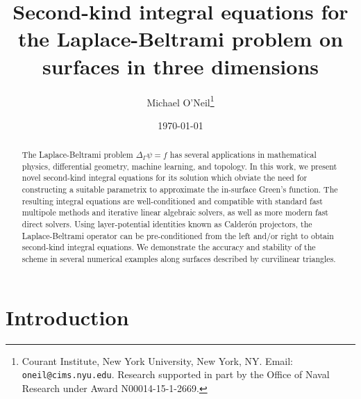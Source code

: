 \documentclass[11pt]{article}
\title{\bf\sffamily Second-kind integral equations for the Laplace-Beltrami
  problem on  surfaces in three dimensions}
\author{Michael O'Neil\footnote{Courant Institute,  New York University, New
    York, NY. Email: {\tt oneil@cims.nyu.edu}. Research supported in
  part by the Office of Naval Research under Award N00014-15-1-2669.}}
\date{\today}
\newcommand{\surflap}{\Delta_\Gamma}
\numberwithin{equation}{section}
\begin{document}
\maketitle 
\begin{abstract}
  The Laplace-Beltrami problem $\surflap \psi = f$ has several
  applications in mathematical physics, differential geometry, machine
  learning, and topology. In this work, we present novel second-kind
  integral equations for its solution 
  which obviate the need for constructing a   suitable parametrix to
  approximate the in-surface Green's function. The resulting integral
  equations are well-conditioned and compatible with standard fast
  multipole methods and iterative linear algebraic solvers, as well as
  more modern fast direct solvers. 
  Using
   layer-potential identities known as Calder\'on projectors, the
   Laplace-Beltrami operator can be pre-conditioned from the left
   and/or right to obtain second-kind integral equations. We
   demonstrate the accuracy and stability of the scheme in several
   numerical examples along surfaces described by curvilinear triangles.
\end{abstract}





\section{Introduction}
\end{document}

